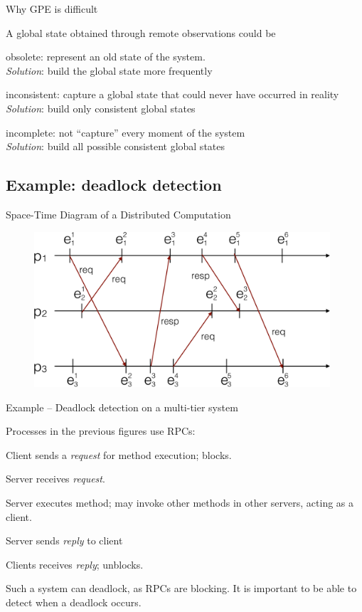 \begin{frame}{Why GPE is difficult}

A global state obtained through remote observations could be
\BIL
\item \alert{obsolete}: represent an old state of the system. \\
  \emph{Solution}: build the global state more frequently
\item \alert{inconsistent}: capture a global state that could never
  have occurred in reality\\
  \emph{Solution}: build only consistent global states
\item \alert{incomplete}: not ``capture'' every moment of the system\\
  \emph{Solution}: build all possible consistent global states
\EIL
\end{frame}

\subsection{Example: deadlock detection}

\begin{frame}{Space-Time Diagram of a Distributed Computation}

\begin{figure} 
\includegraphics[width=11cm]{figs/03/diagram3}
\end{figure}

\end{frame}

\begin{frame}{Example -- Deadlock detection on a multi-tier system}

Processes in the previous figures use RPCs:
\BI
\item Client sends a \emph{request} for method execution; blocks.
\item Server receives \emph{request}.
\item Server executes method; may invoke other methods in other
servers, acting as a client.
\item Server sends \emph{reply} to client
\item Clients receives \emph{reply}; unblocks.
\EI

\bigskip
Such a system can deadlock, as RPCs are blocking. It is important to 
be able to detect when a deadlock occurs.

\end{frame}

